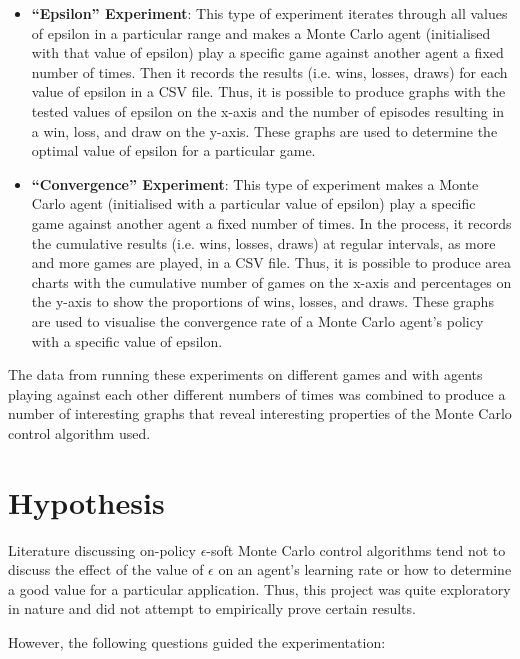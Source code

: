 \documentclass[11pt,a4paper]{report}
\begin{document}
\begin{itemize}

	\item \textbf{``Epsilon'' Experiment}: This type of experiment iterates through all values of epsilon in a particular range and makes a Monte Carlo agent (initialised with that value of epsilon) play a specific game against another agent a fixed number of times. Then it records the results (i.e. wins, losses, draws) for each value of epsilon in a CSV file. Thus, it is possible to produce graphs with the tested values of epsilon on the x-axis and the number of episodes resulting in a win, loss, and draw on the y-axis. These graphs are used to determine the optimal value of epsilon for a particular game.

	\item \textbf{``Convergence'' Experiment}: This type of experiment makes a Monte Carlo agent (initialised with a particular value of epsilon) play a specific game against another agent a fixed number of times. In the process, it records the cumulative results (i.e. wins, losses, draws) at regular intervals, as more and more games are played, in a CSV file. Thus, it is possible to produce area charts with the cumulative number of games on the x-axis and percentages on the y-axis to show the proportions of wins, losses, and draws. These graphs are used to visualise the convergence rate of a Monte Carlo agent's policy with a specific value of epsilon.

\end{itemize}

The data from running these experiments on different games and with agents playing against each other different numbers of times was combined to produce a number of interesting graphs that reveal interesting properties of the Monte Carlo control algorithm used.


\section{Hypothesis}

Literature discussing on-policy $\epsilon$-soft Monte Carlo control algorithms tend not to discuss the effect of the value of $\epsilon$ on an agent's learning rate or how to determine a good value for a particular application. Thus, this project was quite exploratory in nature and did not attempt to empirically prove certain results.

However, the following questions guided the experimentation:
\end{document}

